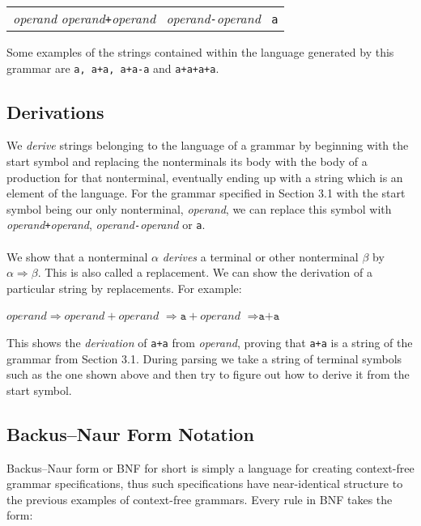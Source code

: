 \documentclass[a4paper, 11pt]{article}
\begin{document}
\begin{center}
	\begin{tabular}{l}
		\textit{operand} \textbf{\textrightarrow} \textit{operand}\texttt{+}\textit{operand} \textbar\ \textit{operand}\texttt{-}\textit{operand} \textbar\ \texttt{a}
	\end{tabular}
\end{center}

Some examples of the strings contained within the language generated by this grammar are \texttt{a, a+a, a+a-a} and \texttt{a+a+a+a}. 

\subsection{Derivations}
We \textit{derive} strings belonging to the language of a grammar by beginning with the start symbol and replacing the nonterminals its body with the body of a production for that nonterminal, eventually ending up with a string which is an element of the language. For the grammar specified in Section 3.1 with the start symbol being our only nonterminal, \textit{operand}, we can replace this symbol with \textit{operand}\texttt{+}\textit{operand}, \textit{operand}\texttt{-}\textit{operand} or \texttt{a}.
\\\\
We show that a nonterminal $\alpha$ \textit{derives} a terminal or other nonterminal $\beta$ by $\alpha \Rightarrow \beta$. This is also called a replacement. We can show the derivation of a particular string by replacements. For example:

\begin{center}
	$operand \Rightarrow operand+operand$ $\Rightarrow \texttt{a}+operand$ $\Rightarrow \texttt{a+a}$
\end{center}

This shows the \textit{derivation} of \texttt{a+a} from \textit{operand}, proving that \texttt{a+a} is a string of the grammar from Section 3.1. During parsing we take a string of terminal symbols such as the one shown above and then try to figure out how to derive it from the start symbol.

\subsection{Backus–Naur Form Notation}
Backus–Naur form or BNF for short is simply a language for creating context-free grammar specifications, thus such specifications have near-identical structure to the previous examples of context-free grammars. Every rule in BNF takes the form:
\end{document}

